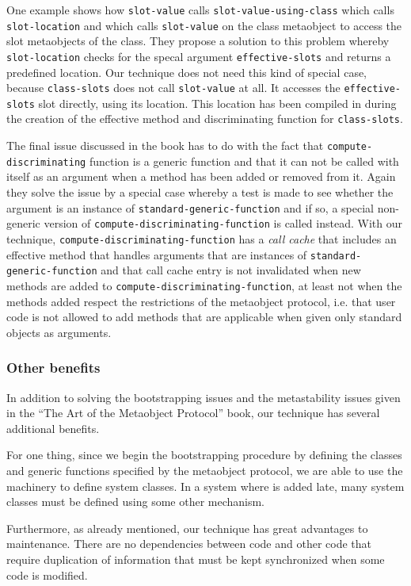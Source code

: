One example shows how \texttt{slot-value} calls
\texttt{slot-value-using-class} which calls \texttt{slot-location} and
which calls \texttt{slot-value} on the class metaobject to access the
slot metaobjects of the class.  They propose a solution to this
problem whereby \texttt{slot-location} checks for the specal argument
\texttt{effective-slots} and returns a predefined location.  Our
technique does not need this kind of special case, because
\texttt{class-slots} does not call \texttt{slot-value} at all.  It
accesses the \texttt{effective-slots} slot directly, using its
location.  This location has been compiled in during the creation of
the effective method and discriminating function for
\texttt{class-slots}.

The final issue discussed in the book has to do with the fact that
\texttt{compute-discriminating} function is a generic function and
that it can not be called with itself as an argument when a method has
been added or removed from it.  Again they solve the issue by a
special case whereby a test is made to see whether the argument is an
instance of \texttt{standard-generic-function} and if so, a special
non-generic version of \texttt{compute-discriminating-function} is
called instead.  With our technique,
\texttt{compute-discriminating-function} has a \emph{call cache} that
includes an effective method that handles arguments that are instances
of \texttt{standard-generic-function} and that call cache entry is not
invalidated when new methods are added to
\texttt{compute-discriminating-function}, at least not when the
methods added respect the restrictions of the metaobject protocol,
i.e. that user code is not allowed to add methods that are applicable
when given only standard objects as arguments.

\subsubsection{Other benefits}

In addition to solving the bootstrapping issues and the metastability
issues given in the ``The Art of the Metaobject Protocol'' book, our
technique has several additional benefits.

For one thing, since we begin the bootstrapping procedure by
defining the classes and generic functions specified by the metaobject
protocol, we are able to use the \clos{} machinery to define system
classes.  In a system where \clos{} is added late, many system classes
must be defined using some other mechanism.

Furthermore, as already mentioned, our technique has great advantages
to maintenance.  There are no dependencies between \clos{} code and
other code that require duplication of information that must be kept
synchronized when some code is modified.
